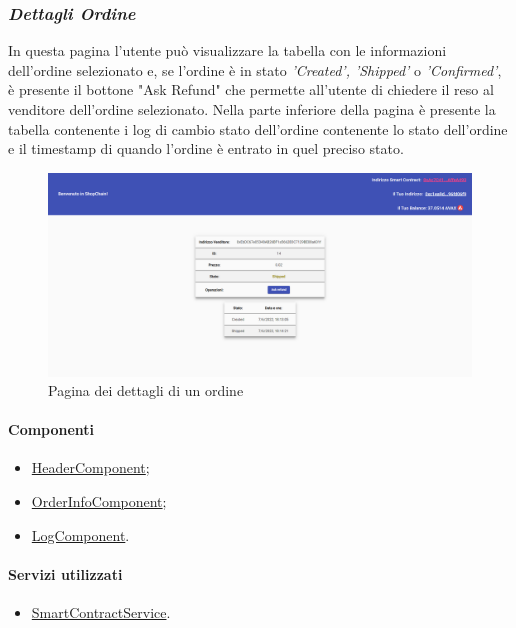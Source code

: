 \newpage

\subsubsection*{\textit{Dettagli Ordine}}
In questa pagina l'utente può visualizzare la tabella con le informazioni dell'ordine selezionato e, se l'ordine è in stato \textit{'Created', 'Shipped'} o \textit{'Confirmed'}, è presente il bottone "Ask Refund" che permette all'utente di chiedere il reso al venditore dell'ordine selezionato. Nella parte inferiore della pagina è presente la tabella contenente i log di cambio stato dell'ordine contenente lo stato dell'ordine e il timestamp di quando l'ordine è entrato in quel preciso stato.

\begin{figure}[!h] 
    \centering 
    \includegraphics[width=1\columnwidth]{immagini/maschere/orderinfo.png} 
    \caption{Pagina dei dettagli di un ordine}
\end{figure}

\paragraph{Componenti}
\begin{itemize}
    \item \hyperref[sec:header-component]{HeaderComponent};
    \item \hyperref[sec:order-info-component]{OrderInfoComponent};
    \item \hyperref[sec:log-component]{LogComponent}.
\end{itemize}

\paragraph{Servizi utilizzati}
\begin{itemize}
    \item \hyperref[sec:smart-contract-service]{SmartContractService}.
\end{itemize}

